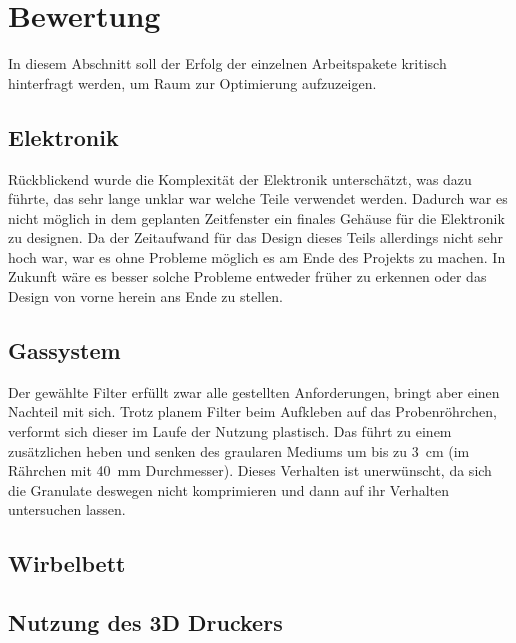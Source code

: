 \newpage

\section{Bewertung}

In diesem Abschnitt soll der Erfolg der einzelnen Arbeitspakete kritisch hinterfragt werden, um Raum zur Optimierung aufzuzeigen. 

\subsection{Elektronik}

Rückblickend wurde die Komplexität der Elektronik unterschätzt, was dazu führte, das sehr lange unklar war welche Teile verwendet werden. Dadurch war es nicht möglich in dem geplanten Zeitfenster ein finales Gehäuse für die Elektronik zu designen. Da der Zeitaufwand für das Design dieses Teils allerdings nicht sehr hoch war, war es ohne Probleme möglich es am Ende des Projekts zu machen. In Zukunft wäre es besser solche Probleme entweder früher zu erkennen oder das Design von vorne herein ans Ende zu stellen. 

\subsection{Gassystem}

Der gewählte Filter erfüllt zwar alle gestellten Anforderungen, bringt aber einen Nachteil mit sich. Trotz planem Filter beim Aufkleben auf das Probenröhrchen, verformt sich dieser im Laufe der Nutzung plastisch. Das führt zu einem zusätzlichen heben und senken des graularen Mediums um bis zu \SI{3}{cm} (im Rährchen mit \SI{40}{mm}  Durchmesser). Dieses Verhalten ist unerwünscht, da sich die Granulate deswegen nicht komprimieren und dann auf ihr Verhalten untersuchen lassen.  

\subsection{Wirbelbett}



\subsection{Nutzung des 3D Druckers}

